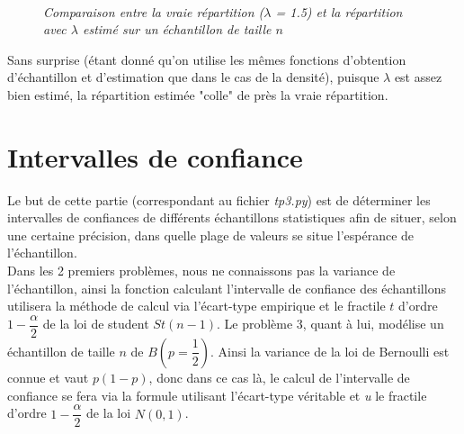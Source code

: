 \documentclass{article}      %
\begin{document}
 \begin{figure}[H]
	\centering
	\\
	\textit{Comparaison entre la vraie répartition ($\lambda$ = 1.5) et la répartition avec $\lambda$ estimé sur un échantillon de taille $n$}
\end{figure}

Sans surprise (étant donné qu'on utilise les mêmes fonctions d'obtention d’échantillon et d'estimation que dans le cas de la densité), puisque $\lambda$ est assez bien estimé, la répartition estimée "colle" de près la vraie répartition.

\section{Intervalles de confiance}
Le but de cette partie (correspondant au fichier \textsl{tp3.py}) est de déterminer les intervalles de confiances de différents échantillons statistiques afin de situer, selon une certaine précision, dans quelle plage de valeurs se situe l'espérance de l'échantillon.\\
Dans les 2 premiers problèmes, nous ne connaissons pas la variance de l'échantillon, ainsi la fonction calculant l'intervalle de confiance des échantillons utilisera la méthode de calcul via l'écart-type empirique et le fractile $t$ d'ordre $1-\dfrac{\alpha}{2}$ de la loi de student $St(n-1)$. Le problème 3, quant à lui, modélise un échantillon de taille $n$ de $B(p = \dfrac{1}{2})$. Ainsi la variance de la loi de Bernoulli est connue et vaut $p(1-p)$, donc dans ce cas là, le calcul de l'intervalle de confiance se fera via la formule utilisant l'écart-type véritable et \textit{u} le fractile d'ordre $1-\dfrac{\alpha}{2}$ de la loi $N(0,1)$.
\end{document}
